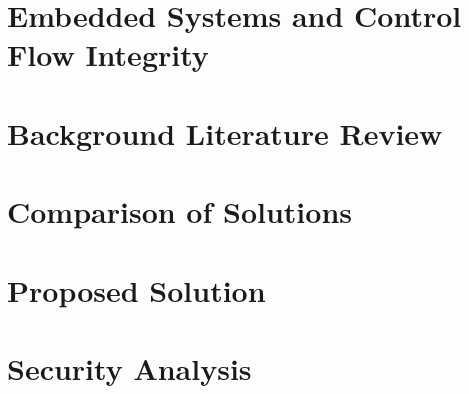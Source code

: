 \documentclass[
11pt, %
twoside, %
english, %
onehalfspacing, %
nolistspacing, %
liststotoc, %
parskip, %
headsepline, %
]{MastersDoctoralThesis} %
\newif\ifnotesincluded
\begin{document}
\chapter{Embedded Systems and Control Flow Integrity} \label{chapterCFI}





\chapter{Background Literature Review} \label{chapterBackground}


\chapter{Comparison of Solutions} \label{chapterComparison}






\chapter{Proposed Solution} \label{chapterTheoreticalSolution}






\chapter{Security Analysis} \label{chapterSecurityAnalysis}


\fi

\ifnotesincluded
\chapter{Conclusion} \label{chapterConclusion}

\fi

\begin{sloppypar}
\printbibliography
\end{sloppypar}
\end{document}

